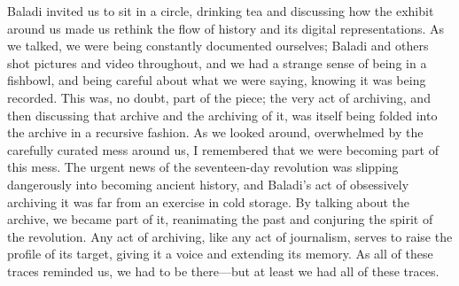 Baladi invited us to sit in a circle, drinking tea and discussing how the exhibit around us made us rethink the flow of history and its digital representations. As we talked, we were being constantly documented ourselves; Baladi and others shot pictures and video throughout, and we had a strange sense of being in a fishbowl, and being careful about what we were saying, knowing it was being recorded. This was, no doubt, part of the piece; the very act of archiving, and then discussing that archive and the archiving of it, was itself being folded into the archive in a recursive fashion. As we looked around, overwhelmed by the carefully curated mess around us, I remembered that we were becoming part of this mess. The urgent news of the seventeen-day revolution was slipping dangerously into becoming ancient history, and Baladi's act of obsessively archiving it was far from an exercise in cold storage. By talking about the archive, we became part of it, reanimating the past and conjuring the spirit of the revolution. Any act of archiving, like any act of journalism, serves to raise the profile of its target, giving it a voice and extending its memory. As all of these traces reminded us, we had to be there---but at least we had all of these traces.



